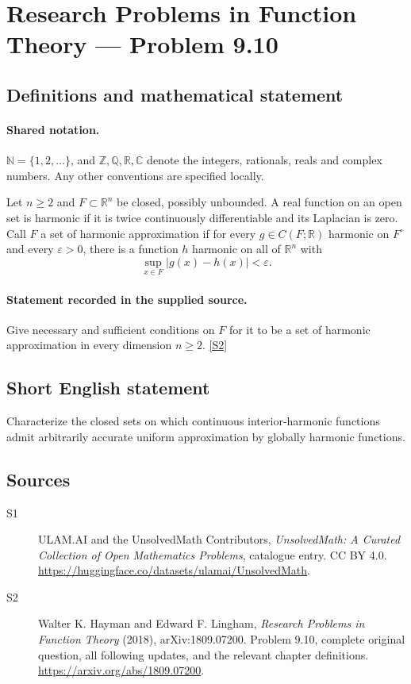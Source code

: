 \documentclass[11pt]{book}
\newcommand{\sref}[2]{\hyperlink{source:#1:#2}{[S#2]}}
\begin{document}
\section{Research Problems in Function Theory — Problem 9.10}\label{statement}

\subsection{Definitions and mathematical statement}

\paragraph{Shared notation.}$\mathbb N=\{1,2,\ldots\}$, and $\mathbb Z,\mathbb Q,\mathbb R,\mathbb C$ denote the integers, rationals, reals and complex numbers. Any other conventions are specified locally.


Let $n\ge2$ and $F\subset\mathbb R^n$ be closed, possibly unbounded. A real function on an open set is harmonic if it is twice continuously differentiable and its Laplacian is zero. Call $F$ a set of harmonic approximation if for every $g\in C(F;\mathbb R)$ harmonic on $F^{\circ}$ and every $\varepsilon>0$, there is a function $h$ harmonic on all of $\mathbb R^n$ with \[\sup_{x\in F}|g(x)-h(x)|<\varepsilon.\]
\paragraph{Statement recorded in the supplied source.}
Give necessary and sufficient conditions on $F$ for it to be a set of harmonic approximation in every dimension $n\ge2$. \sref{statement}{2}
\subsection{Short English statement}
Characterize the closed sets on which continuous interior-harmonic functions admit arbitrarily accurate uniform approximation by globally harmonic functions.
\subsection{Sources}
\begin{description}
\item[\hypertarget{source:statement:1}{S1}] ULAM.AI and the UnsolvedMath Contributors, \emph{UnsolvedMath: A Curated Collection of Open Mathematics Problems}, catalogue entry. CC BY 4.0. \url{https://huggingface.co/datasets/ulamai/UnsolvedMath}.
\item[\hypertarget{source:statement:2}{S2}] Walter K. Hayman and Edward F. Lingham, \emph{Research Problems in Function Theory} (2018), arXiv:1809.07200. Problem 9.10, complete original question, all following updates, and the relevant chapter definitions. \url{https://arxiv.org/abs/1809.07200}.
\end{description}
\label{end:statement}
\end{document}
